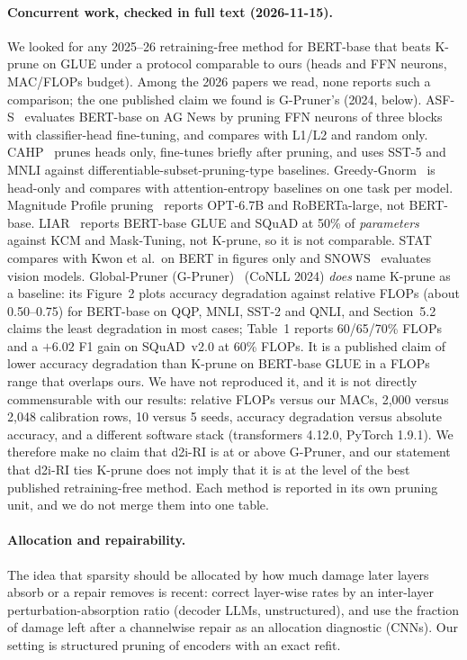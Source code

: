 \documentclass[11pt]{article}
\begin{document}
\paragraph{Concurrent work, checked in full text (2026-11-15).} We looked for any 2025--26 retraining-free method for BERT-base that
beats K-prune on GLUE under a protocol comparable to ours (heads and FFN neurons, MAC/FLOPs budget). Among the 2026 papers we read, none reports such a comparison; the one published claim we found is G-Pruner's (2024, below). ASF-S~\citep{illeperuma2026asfs} evaluates BERT-base on AG News by pruning FFN neurons of three blocks with
classifier-head fine-tuning, and compares with L1/L2 and random only. CAHP~\citep{livertovsky2026cahp} prunes heads only, fine-tunes briefly after pruning, and uses SST-5 and MNLI
against differentiable-subset-pruning-type baselines. Greedy-Gnorm~\citep{guo2026gnorm} is head-only and compares with attention-entropy baselines on one task per model.
Magnitude Profile pruning~\citep{mpg2026} reports OPT-6.7B and RoBERTa-large, not BERT-base. LIAR~\citep{wang2024liar} reports BERT-base GLUE and SQuAD at 50\% of \emph{parameters}
against KCM and Mask-Tuning, not K-prune, so it is not comparable. STAT~\citep{stat2024} compares with Kwon et al.\ on BERT in figures only and SNOWS~\citep{snows2024} evaluates vision models.
Global-Pruner (G-Pruner)~\citep{yao2024globalpruner} (CoNLL 2024) \emph{does} name K-prune as a baseline: its Figure~2 plots accuracy degradation against relative FLOPs (about 0.50--0.75) for BERT-base on QQP, MNLI, SST-2 and QNLI,
and Section~5.2 claims the least degradation in most cases; Table~1 reports 60/65/70\% FLOPs and a $+6.02$ F1 gain on SQuAD~v2.0 at 60\% FLOPs.
It is a published claim of lower accuracy degradation than K-prune on BERT-base GLUE in a FLOPs range that overlaps ours. We have not reproduced it, and it is not directly commensurable with our results: relative FLOPs versus our MACs,
2{,}000 versus 2{,}048 calibration rows, 10 versus 5 seeds, accuracy degradation versus absolute accuracy, and a different software stack (transformers 4.12.0, PyTorch 1.9.1). We therefore make no claim that d2i-RI is at or above G-Pruner, and our
statement that d2i-RI ties K-prune does not imply that it is at the level of the best published retraining-free method.
Each method is reported in its own pruning unit, and we do not merge them into one table.
\paragraph{Allocation and repairability.} The idea that sparsity should be allocated by how much damage later layers
absorb or a repair removes is recent: \citet{jing2026absorption} correct layer-wise rates by an inter-layer
perturbation-absorption ratio (decoder LLMs, unstructured), and \citet{zhan2026repairability} use the fraction of
damage left after a channelwise repair as an allocation diagnostic (CNNs). Our setting is structured pruning of encoders
with an exact refit.
\end{document}
